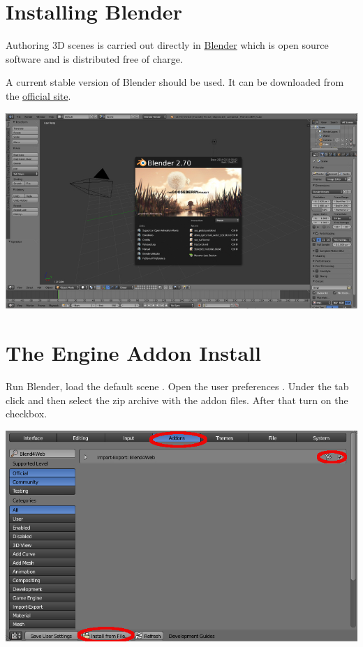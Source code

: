 \documentclass[a4paper,12pt,oneside]{sphinxmanual}
\begin{document}
\section{Installing Blender}
\label{first_steps:quick-install-blender}\label{first_steps:blender}
Authoring 3D scenes is carried out directly in \href{http://en.wikipedia.org/wiki/Blender\_(software)}{Blender} which is open source software and is distributed free of charge.

A current stable version of Blender should be used. It can be downloaded from the \href{http://www.blender.org/download}{official site}.

{\hfill\includegraphics[width=1.000\linewidth]{blender_first_run.jpg}\hfill}


\section{The Engine Addon Install}
\label{first_steps:quick-install-addon}\label{first_steps:id4}\label{first_steps:index-0}
Run Blender, load the default scene . Open the user preferences . Under the  tab click  and then select the zip archive with the addon files. After that turn on the   checkbox.

{\hfill\includegraphics[width=1.000\linewidth]{user_preferences_install_b2w.jpg}\hfill}
\end{document}
